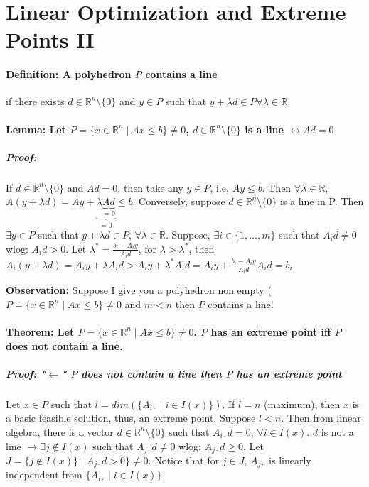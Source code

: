 \documentclass[main]{subfiles}
\begin{document}

\section{Linear Optimization and Extreme Points II}

\paragraph{Definition: A polyhedron $P$ contains a line} if there exists $d \in \mathbb{R}^{n}\setminus\{0\}$ and $y \in P$ such that $y + \lambda d \in P \forall \lambda \in \mathbb{R}$

\paragraph{Lemma: Let $P = \{ x \in \mathbb{R}^{n} \mid Ax \leq b \} \neq 0$, $d \in \mathbb{R}^{n}\setminus \{0\}$ is a line $\leftrightarrow Ad = 0$ }
\subparagraph{Proof:}
If $d \in \mathbb{R}^{n}\setminus \{0\}$ and $Ad=0$, then take any $y \in P$, i.e, $Ay \leq b$. Then $\forall \lambda \in \mathbb{R}$, $A(y+\lambda d) = Ay + \underbrace{\lambda \underbrace{Ad}_{=0}}_{=0} \leq b$.
Conversely, suppose $d \in \mathbb{R}^{n}\setminus \{0\}$ is a line in P. Then $\exists y \in P$ such that $y + \lambda d \in P$, $\forall \lambda \in \mathbb{R}$.
Suppose, $\exists i \in \{1, \dots, m \}$ such that $A_{i}d \neq 0$ wlog: $A_{i}d > 0$. Let $\lambda^{*} = \frac{b_{i} - A_{i}y}{A_{i}d}$, for $\lambda > \lambda^{*}$, then $A_{i}(y + \lambda d) = A_{i}y + \lambda A_{i}d > A_{i}y + \lambda^{*}A_{i}d = A_{i}y + \frac{b_{i} - A_{i}y}{A_{i}d} A_{i}d = b_{i}$

\textbf{Observation:} Suppose I give you a polyhedron non empty ($P = \{x \in \mathbb{R}^{n} \mid Ax \leq b\} \neq 0$ and $m < n$ then $P$ contains a line!

\paragraph{Theorem: Let $P = \{x \in \mathbb{R}^{n} \mid Ax \leq b\} \neq 0$. $P$ has an extreme point iff $P$ does not contain a line.}

\subparagraph{Proof: "$\leftarrow$" $P$ does not contain a line then $P$ has an extreme point}
Let $x \in P$ such that $l = dim(\{A_{i\cdot} \mid i \in I(x)\})$. If $l = n$ (maximum), then $x$ is a basic feasible solution, thus, an extreme point.
Suppose $l < n$. Then from linear algebra, there is a vector $ d \in \mathbb{R}^{n}\setminus\{0\}$ such that $A_{i\cdot}d = 0$, $\forall i \in I(x)$. $d$ is not a line $\rightarrow \exists j \notin I(x)$ such that $A_{j\cdot}d \neq 0$
wlog: $A_{j\cdot}d \geq 0$. Let $J = \{j \notin I(x)\} \mid A_{j\cdot}d > 0\} \neq 0$.
Notice that for $j \in J$, $A_{j\cdot}$ is linearly independent from $\{A_{i\cdot} \mid i \in I(x) \}$
\end{document}
